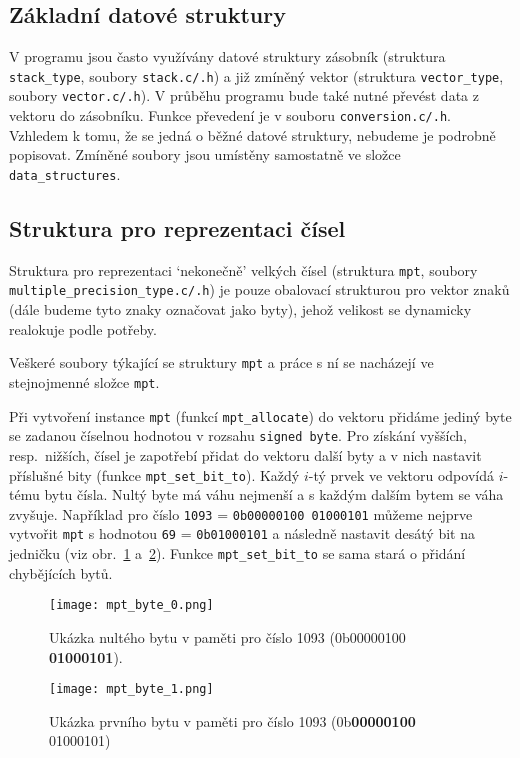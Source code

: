 \subsection{Základní datové struktury}
V programu jsou často využívány datové struktury zásobník (struktura \verb|stack_type|, soubory \verb|stack.c/.h|) a již zmíněný vektor (struktura \verb|vector_type|, soubory \verb|vector.c/.h|).
V průběhu programu bude také nutné převést data z vektoru do zásobníku. Funkce převedení je v souboru \verb|conversion.c/.h|. Vzhledem k tomu, že se jedná o běžné datové struktury, nebudeme je podrobně popisovat. Zmíněné soubory jsou umístěny samostatně ve složce \verb|data_structures|. 

\subsection{Struktura pro reprezentaci čísel}\label{subsection:mpt}
Struktura pro reprezentaci `nekonečně' velkých čísel (struktura \verb|mpt|, soubory \\ \verb|multiple_precision_type.c/.h|) je pouze obalovací strukturou pro vektor znaků (dále budeme tyto znaky označovat jako byty), jehož velikost se dynamicky realokuje podle potřeby.

Veškeré soubory týkající se struktury \verb|mpt| a práce s ní se nacházejí ve stejnojmenné složce \verb|mpt|.

Při vytvoření instance \verb|mpt| (funkcí \verb|mpt_allocate|) do vektoru přidáme jediný byte se zadanou číselnou hodnotou v rozsahu \verb|signed byte|. Pro získání vyšších, resp.~nižších, čísel je zapotřebí přidat do vektoru další byty a v nich nastavit příslušné bity (funkce \verb|mpt_set_bit_to|). Každý $i$-tý prvek ve vektoru odpovídá $i$-tému bytu čísla. Nultý byte má váhu nejmenší a s každým dalším bytem se váha zvyšuje. Například pro číslo \verb|1093| = \verb|0b00000100 01000101| můžeme nejprve vytvořit \verb|mpt| s hodnotou \verb|69| = \verb|0b01000101| a následně nastavit desátý bit na jedničku (viz obr.~\ref{fig:mpt_byte_0} a~\ref{fig:mpt_byte_1}). Funkce \verb|mpt_set_bit_to| se sama stará o přidání chybějících bytů.

\begin{figure}[ht]
    \centering
    \texttt{[image: mpt\_byte\_0.png]}
    \caption{Ukázka nultého bytu v paměti pro číslo 1093 (0b00000100 \textbf{01000101}).}\label{fig:mpt_byte_0}
\end{figure}
\begin{figure}[ht]
    \centering
    \texttt{[image: mpt\_byte\_1.png]}
    \caption{Ukázka prvního bytu v paměti pro číslo 1093 (0b\textbf{00000100} 01000101)}\label{fig:mpt_byte_1}
\end{figure}

